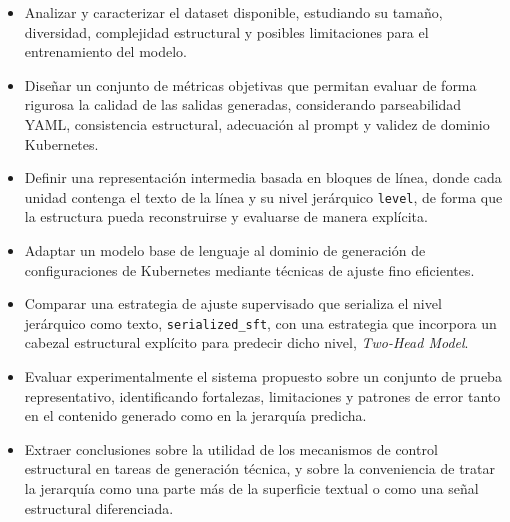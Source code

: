 \begin{itemize}
    \item Analizar y caracterizar el dataset disponible, estudiando su tamaño, diversidad, complejidad estructural y posibles limitaciones para el entrenamiento del modelo.
    
    \item Diseñar un conjunto de métricas objetivas que permitan evaluar de forma rigurosa la calidad de las salidas generadas, considerando parseabilidad YAML, consistencia estructural, adecuación al prompt y validez de dominio Kubernetes.
    
    \item Definir una representación intermedia basada en bloques de línea, donde cada unidad contenga el texto de la línea y su nivel jerárquico \texttt{level}, de forma que la estructura pueda reconstruirse y evaluarse de manera explícita.
    
    \item Adaptar un modelo base de lenguaje al dominio de generación de configuraciones de Kubernetes mediante técnicas de ajuste fino eficientes.
    
    \item Comparar una estrategia de ajuste supervisado que serializa el nivel jerárquico como texto, \texttt{serialized\_sft}, con una estrategia que incorpora un cabezal estructural explícito para predecir dicho nivel, \textit{Two-Head Model}.
    
    \item Evaluar experimentalmente el sistema propuesto sobre un conjunto de prueba representativo, identificando fortalezas, limitaciones y patrones de error tanto en el contenido generado como en la jerarquía predicha.
    
    \item Extraer conclusiones sobre la utilidad de los mecanismos de control estructural en tareas de generación técnica, y sobre la conveniencia de tratar la jerarquía como una parte más de la superficie textual o como una señal estructural diferenciada.
\end{itemize}
